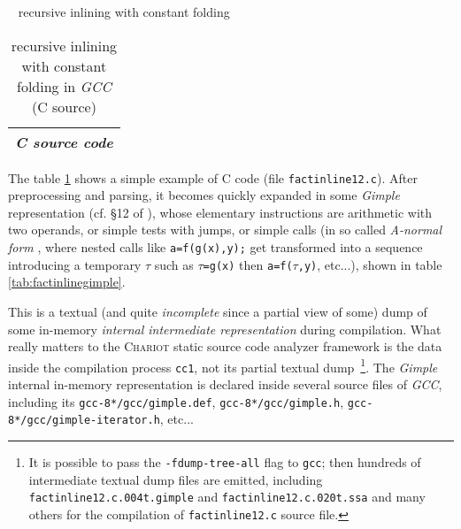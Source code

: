 \bigskip

\bigskip

{{\raisebox{3pt}{\textcolor{brown}{\rule{0.2\textwidth}{2.0pt}}}} ~ \large{recursive inlining with constant folding}}



\begin{table}[!htbp]
\caption{\label{tab:factinlinecsrc} recursive inlining with constant folding in \emph{GCC} (C source)}
   \medskip
  \begin{center}
    \begin{relsize}{-1.2}
     \begin{tabular}{c}
       \\ 
       \textbf{\emph{C source code}} \\ 
       \hline
     \end{tabular}
    \end{relsize}
  \end{center}
\end{table}

The table \ref{tab:factinlinecsrc} shows a simple example of C code
(file \texttt{factinline12.c}). After preprocessing and parsing, it
becomes quickly expanded in some \emph{Gimple}
representation (cf. \S{12} of \cite{gcc-internals}), whose elementary
instructions are arithmetic with two operands, or simple tests with
jumps, or simple calls (in so called \emph{A-normal form}
, where nested calls like \verb+a=f(g(x),y);+ get
transformed into a sequence introducing a temporary $\tau$ such as
$\tau$\verb+=g(x)+ then \verb+a=f(+$\tau$\verb+,y)+, etc...), shown in
table \ref{tab:factinlinegimple}.



This is a textual (and quite
\emph{incomplete} since a partial view of some) dump of some in-memory
\emph{internal intermediate representation} during compilation. What
really matters to the \textsc{Chariot} static source code analyzer
framework is the data inside the compilation process \texttt{cc1}, not
its partial textual dump~\footnote{It is possible to pass the
  \texttt{-fdump-tree-all} flag to \texttt{gcc}; then hundreds of
  intermediate textual dump files are emitted, including
  \texttt{factinline12.c.004t.gimple} and
  \texttt{factinline12.c.020t.ssa} and many others for the compilation
  of \texttt{factinline12.c} source file.}. The \emph{Gimple} internal
in-memory representation is declared inside several source files of
\emph{GCC}, including its \texttt{gcc-8*/gcc/gimple.def},
\texttt{gcc-8*/gcc/gimple.h},
\texttt{gcc-8*/gcc/gimple-iterator.h}, etc...


